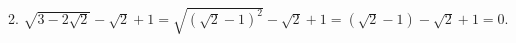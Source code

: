 2. $\sqrt{3-2\sqrt{2}}-\sqrt{2}+1 = \sqrt{(\sqrt{2} - 1)^2} - \sqrt{2} + 1 = (\sqrt{2} - 1) - \sqrt{2} + 1 = 0.$\\
